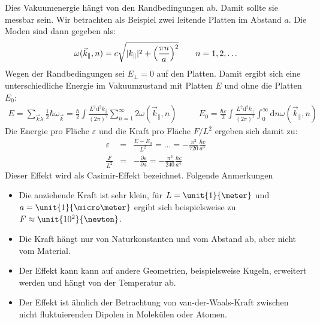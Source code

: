 Dies Vakuumenergie hängt von den Randbedingungen ab. Damit sollte sie messbar sein. Wir betrachten als Beispiel zwei leitende Platten im Abstand $a$. Die Moden sind dann gegeben als: 
\begin{eqnarray*}
\omega(\vec k_\parallel , n) = c \sqrt{|k_\parallel|^2 + \left(\frac{\pi n }a\right)^2}\qquad n = 1,2,\dots
\end{eqnarray*}
Wegen der Randbedingungen sei $E_\perp = 0$ auf den Platten. Damit ergibt sich eine unterschiedliche Energie im Vakuumzustand mit Platten $E$ und ohne die Platten $E_0$: 
\begin{eqnarray*}
E = \sum_{\vec k \lambda}\frac 1 2 \hbar \omega_{\vec k} = \frac\hbar 2 \int \frac{L^2 \mathrm{d}^2k_\parallel}{(2\pi)^2} \sum_{n=1}^\infty 2 \omega ( \vec k_\parallel,n) &\quad& E_0 = \frac{\hbar c}2 \int \frac{L^2 \mathrm{d}^2k_\parallel}{(2 \pi)^2} \int_0^\infty \mathrm{d}n \omega(\vec k_\parallel, n)
\end{eqnarray*}
Die Energie pro Fläche $\varepsilon$ und die Kraft pro Fläche $F/L^2$ ergeben sich damit zu: 
\begin{eqnarray*}
\varepsilon &=& \frac{E-E_0}{L^2} = \dots = - \frac{\pi^2}{720}\frac{\hbar c}{a^3}
\\
\frac F{L^2} &=& - \frac{\partial \varepsilon}{\partial a} = - \frac{\pi^2}{240}\frac{\hbar c}{a^4}
\end{eqnarray*}
Dieser Effekt wird als Casimir-Effekt bezeichnet. Folgende Anmerkungen 
\begin{itemize}
\item Die anziehende Kraft ist sehr klein, für $L=\unit{1}{\meter}$ und $a=\unit{1}{\micro\meter}$ ergibt sich beispielsweise zu $F\approx \unit{10^2}{\newton}$. 
\item Die Kraft hängt nur von Naturkonstanten und vom Abstand ab, aber nicht vom Material.
\item Der Effekt kann kann auf andere Geometrien, beispielsweise Kugeln, erweitert werden und hängt von der Temperatur ab. 
\item Der Effekt ist ähnlich der Betrachtung von van-der-Waals-Kraft zwischen nicht fluktuierenden Dipolen in Molekülen oder Atomen. 
\end{itemize}

